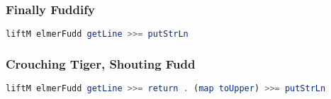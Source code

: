 \documentclass[presentation.tex]{subfiles}
\begin{document}
\begin{frame}[fragile]
  \frametitle{Finally Fuddify}

  \begin{lstlisting}[frame=single,language=Haskell,breaklines=true]
    liftM elmerFudd getLine >>= putStrLn
  \end{lstlisting}
\end{frame}


\begin{frame}[fragile]
  \frametitle{Crouching Tiger, Shouting Fudd}

  \begin{lstlisting}[frame=single,language=Haskell,breaklines=true]
    liftM elmerFudd getLine >>= return . (map toUpper) >>= putStrLn
  \end{lstlisting}
\end{frame}
\end{document}
